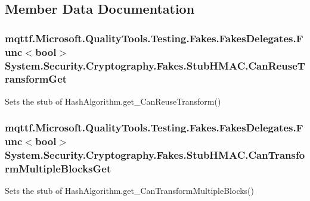 \subsection{Member Data Documentation}
\hypertarget{class_system_1_1_security_1_1_cryptography_1_1_fakes_1_1_stub_h_m_a_c_aff1a580abf5b16145bae02afcf205864}{
\subsubsection[{Can\-Reuse\-Transform\-Get}]{\setlength{\rightskip}{0pt plus 5cm}mqttf.\-Microsoft.\-Quality\-Tools.\-Testing.\-Fakes.\-Fakes\-Delegates.\-Func$<$bool$>$ System.\-Security.\-Cryptography.\-Fakes.\-Stub\-H\-M\-A\-C.\-Can\-Reuse\-Transform\-Get}}\label{class_system_1_1_security_1_1_cryptography_1_1_fakes_1_1_stub_h_m_a_c_aff1a580abf5b16145bae02afcf205864}


Sets the stub of Hash\-Algorithm.\-get\-\_\-\-Can\-Reuse\-Transform()

\hypertarget{class_system_1_1_security_1_1_cryptography_1_1_fakes_1_1_stub_h_m_a_c_a92a1c0f502cec5a8ebb2887145e3a015}{
\subsubsection[{Can\-Transform\-Multiple\-Blocks\-Get}]{\setlength{\rightskip}{0pt plus 5cm}mqttf.\-Microsoft.\-Quality\-Tools.\-Testing.\-Fakes.\-Fakes\-Delegates.\-Func$<$bool$>$ System.\-Security.\-Cryptography.\-Fakes.\-Stub\-H\-M\-A\-C.\-Can\-Transform\-Multiple\-Blocks\-Get}}\label{class_system_1_1_security_1_1_cryptography_1_1_fakes_1_1_stub_h_m_a_c_a92a1c0f502cec5a8ebb2887145e3a015}


Sets the stub of Hash\-Algorithm.\-get\-\_\-\-Can\-Transform\-Multiple\-Blocks()

